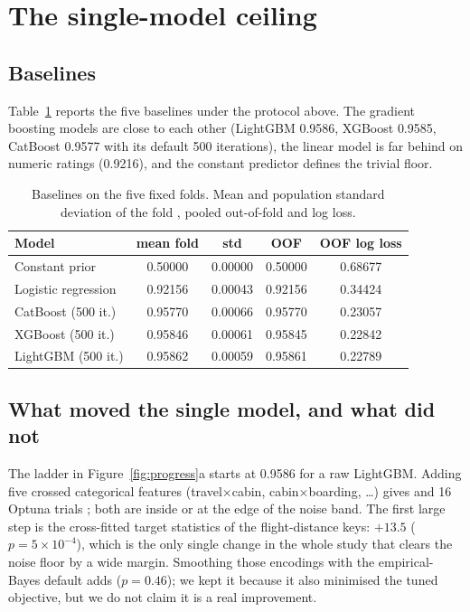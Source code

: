 \section{The single-model ceiling}
\label{sec:single}

\subsection{Baselines}
Table~\ref{tab:baselines} reports the five baselines under the protocol above. The gradient
boosting models are close to each other (LightGBM \citep{lightgbm_docs} 0.9586,
XGBoost \citep{chen2016} 0.9585, CatBoost \citep{prokhorenkova2018} 0.9577 with its default 500
iterations), the linear model is far behind on numeric ratings (0.9216), and the constant
predictor defines the trivial floor.

\begin{table}[t]
\centering
\small
\caption{Baselines on the five fixed folds. Mean and population standard deviation of the fold
\auc{}, pooled out-of-fold \auc{} and log loss.}
\label{tab:baselines}
\begin{tabular}{lcccc}
\toprule
Model & mean fold \auc{} & std & OOF \auc{} & OOF log loss\\
\midrule
Constant prior            & 0.50000 & 0.00000 & 0.50000 & 0.68677\\
Logistic regression       & 0.92156 & 0.00043 & 0.92156 & 0.34424\\
CatBoost (500 it.)        & 0.95770 & 0.00066 & 0.95770 & 0.23057\\
XGBoost (500 it.)         & 0.95846 & 0.00061 & 0.95845 & 0.22842\\
LightGBM (500 it.)        & 0.95862 & 0.00059 & 0.95861 & 0.22789\\
\bottomrule
\end{tabular}
\end{table}

\subsection{What moved the single model, and what did not}
The ladder in Figure~\ref{fig:progress}a starts at 0.9586 for a raw LightGBM. Adding five
crossed categorical features (travel$\times$cabin, cabin$\times$boarding, \ldots) gives
 and 16 Optuna trials ; both are inside or at the edge of the noise band. The
first large step is the cross-fitted target statistics of the flight-distance keys:
$+13.5$ \dlt{} ($p=5\times10^{-4}$), which is the only single change in the whole study that
clears the noise floor by a wide margin. Smoothing those encodings with the empirical-Bayes
default adds  ($p=0.46$); we kept it because it also minimised the tuned objective,
but we do not claim it is a real improvement.

